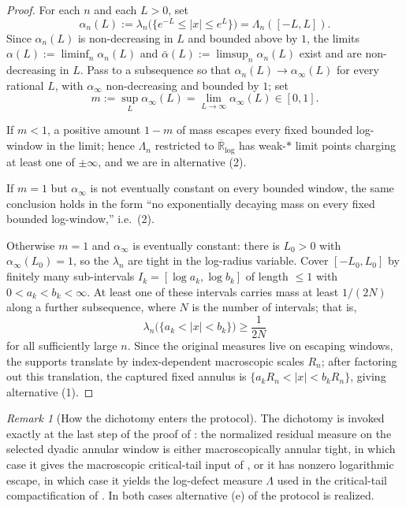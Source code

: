 \documentclass[11pt]{amsart}
\numberwithin{equation}{section}
\theoremstyle{plain}
\theoremstyle{definition}
\theoremstyle{remark}
\newtheorem{remark}[remark]{Remark}
\begin{document}
\begin{proof}
For each \(n\) and each \(L>0\), set
\[
   \alpha_n(L):=\lambda_n\bigl(\{e^{-L}\le|x|\le e^L\}\bigr)
   =\Lambda_n([-L,L]).
\]
Since \(\alpha_n(L)\) is non-decreasing in \(L\) and bounded above by \(1\),
the limits
\(\alpha(L):=\liminf_n\alpha_n(L)\) and
\(\bar\alpha(L):=\limsup_n\alpha_n(L)\) exist and are non-decreasing in
\(L\).  Pass to a subsequence so that \(\alpha_n(L)\to\alpha_\infty(L)\) for
every rational \(L\), with \(\alpha_\infty\) non-decreasing and bounded by
\(1\); set
\[
   m:=\sup_L \alpha_\infty(L)
   =\lim_{L\to\infty}\alpha_\infty(L)\in[0,1] .
\]

If \(m<1\), a positive amount \(1-m\) of mass escapes every fixed bounded
log-window in the limit; hence \(\Lambda_n\) restricted to
\(\overline{\mathbb R}_{\log}\) has weak-\(*\) limit points charging at least
one of \(\pm\infty\), and we are in alternative \textup{(2)}.

If \(m=1\) but \(\alpha_\infty\) is not eventually constant on every bounded
window, the same conclusion holds in the form ``no exponentially decaying
mass on every fixed bounded log-window,'' i.e.\ \textup{(2)}.

Otherwise \(m=1\) and \(\alpha_\infty\) is eventually constant: there is
\(L_0>0\) with \(\alpha_\infty(L_0)=1\), so the \(\lambda_n\) are tight in
the log-radius variable.  Cover \([-L_0,L_0]\) by finitely many sub-intervals
\(I_k=[\log a_k,\log b_k]\) of length \(\le1\) with \(0<a_k<b_k<\infty\).
At least one of these intervals carries mass at least \(1/(2N)\) along a
further subsequence, where \(N\) is the number of intervals; that is,
\[
   \lambda_n\bigl(\{a_k<|x|<b_k\}\bigr)\ge \frac{1}{2N}
\]
for all sufficiently large \(n\).  Since the original measures live on
escaping windows, the supports translate by index-dependent macroscopic
scales \(R_n\); after factoring out this translation, the captured fixed
annulus is \(\{a_kR_n<|x|<b_kR_n\}\), giving alternative
\textup{(1)}.
\end{proof}

\begin{remark}[How the dichotomy enters the protocol]
\label{rem:annular-dichotomy-protocol}
The dichotomy
 is invoked exactly at the
last step of the proof of
: the normalized residual
measure on the selected dyadic annular window is either macroscopically
annular tight, in which case it gives the macroscopic critical-tail input of
, or it has nonzero logarithmic
escape, in which case it yields the log-defect measure \(\Lambda\) used in
the critical-tail compactification of
.  In both cases alternative
\textup{(e)} of the protocol is realized.
\end{remark}
\end{document}
